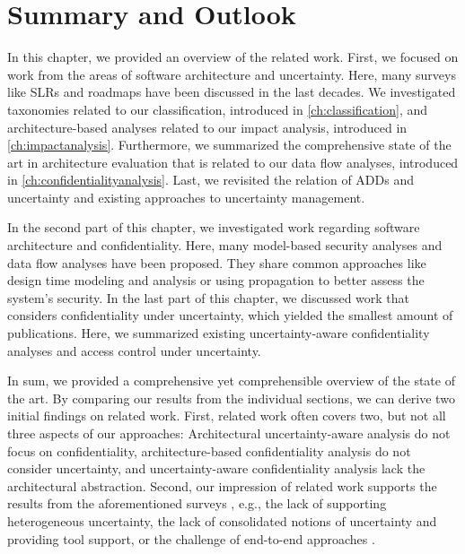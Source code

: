 




\section{Summary and Outlook}%
\label{sec:relatedwork:summary}

In this chapter, we provided an overview of the related work.
First, we focused on work from the areas of software architecture and uncertainty.
Here, many surveys like \acp{SLR} and roadmaps have been discussed in the last decades.
We investigated taxonomies related to our classification, introduced in \autoref{ch:classification}, and architecture-based analyses related to our impact analysis, introduced in \autoref{ch:impactanalysis}.
Furthermore, we summarized the comprehensive state of the art in architecture evaluation that is related to our data flow analyses, introduced in \autoref{ch:confidentialityanalysis}.
Last, we revisited the relation of \acp{ADD} and uncertainty and existing approaches to uncertainty management.

In the second part of this chapter, we investigated work regarding software architecture and confidentiality.
Here, many model-based security analyses and data flow analyses have been proposed.
They share common approaches like design time modeling and analysis or using propagation to better assess the system's security.
In the last part of this chapter, we discussed work that considers confidentiality under uncertainty, which yielded the smallest amount of publications.
Here, we summarized existing uncertainty-aware confidentiality analyses and access control under uncertainty.

In sum, we provided a comprehensive yet comprehensible overview of the state of the art.
By comparing our results from the individual sections, we can derive two initial findings on related work.
First, related work often covers two, but not all three aspects of our approaches: Architectural uncertainty-aware analysis do not focus on confidentiality, architecture-based confidentiality analysis do not consider uncertainty, and uncertainty-aware confidentiality analysis lack the architectural abstraction.
Second, our impression of related work supports the results from the aforementioned surveys \cite{troya_uncertainty_2021,hezavehi_uncertainty_2021}, e.g., the lack of supporting heterogeneous uncertainty, the lack of consolidated notions of uncertainty and providing tool support, or the challenge of end-to-end approaches \cite{weyns_introduction_2020}.

